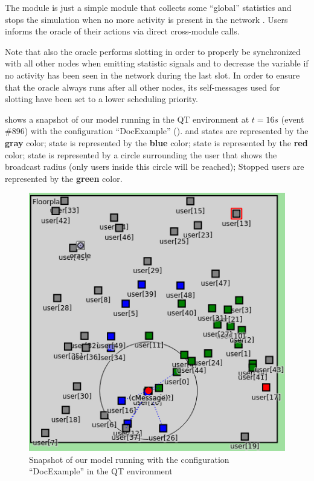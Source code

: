 The  module is just a simple module that collects some ``global''
statistics and stops the simulation when no more activity is present in the
network . Users informs the oracle
of their actions via direct cross-module calls.

Note that also the oracle performs slotting in order to properly be synchronized
with all other nodes when emitting statistic signals and to decrease the
 variable if no activity has been seen in the network during the
last slot. In order to ensure that the oracle always runs after all other nodes,
its self-messages used for slotting have been set to a lower scheduling
priority.

 shows a snapshot of our model running in the \omnetpp{} QT
environment at \(t = 16s\) (event \#896) with the configuration ``DocExample''
().  and  states are represented by
the \textcolor{idle}{\textbf{gray}} color;  state is represented
by the \textcolor{hearing}{\textbf{blue}} color;  state is
represented by the \textcolor{collision}{\textbf{red}} color; 
state is represented by a circle surrounding the user that shows the broadcast
radius (only users inside this circle will be reached); Stopped users are
represented by the \textcolor{relayed}{\textbf{green}} color.

\begin{figure}[htb]
	\centering
	\includegraphics[width=\textwidth]{img/snapshot}
	\caption{Snapshot of our model running with the configuration
	``DocExample'' in the \omnetpp{} QT environment}\label{fig:snapshot}
\end{figure}
